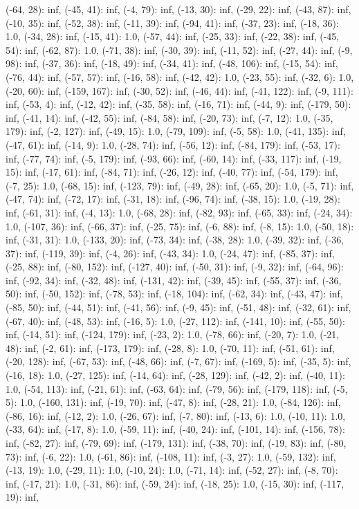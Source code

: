 \documentclass[parskip=half]{scrartcl}
\begin{document}
(-64, 28): inf, (-45, 41): inf, (-4, 79): inf, (-13, 30): inf, (-29, 22): inf, (-43, 87): inf, (-10, 35): inf, (-52, 38): inf, (-11, 39): inf, (-94, 41): inf, (-37, 23): inf, (-18, 36): 1.0, (-34, 28): inf, (-15, 41): 1.0, (-57, 44): inf, (-25, 33): inf, (-22, 38): inf, (-45, 54): inf, (-62, 87): 1.0, (-71, 38): inf, (-30, 39): inf, (-11, 52): inf, (-27, 44): inf, (-9, 98): inf, (-37, 36): inf, (-18, 49): inf, (-34, 41): inf, (-48, 106): inf, (-15, 54): inf, (-76, 44): inf, (-57, 57): inf, (-16, 58): inf, (-42, 42): 1.0, (-23, 55): inf, (-32, 6): 1.0, (-20, 60): inf, (-159, 167): inf, (-30, 52): inf, (-46, 44): inf, (-41, 122): inf, (-9, 111): inf, (-53, 4): inf, (-12, 42): inf, (-35, 58): inf, (-16, 71): inf, (-44, 9): inf, (-179, 50): inf, (-41, 14): inf, (-42, 55): inf, (-84, 58): inf, (-20, 73): inf, (-7, 12): 1.0, (-35, 179): inf, (-2, 127): inf, (-49, 15): 1.0, (-79, 109): inf, (-5, 58): 1.0, (-41, 135): inf, (-47, 61): inf, (-14, 9): 1.0, (-28, 74): inf, (-56, 12): inf, (-84, 179): inf, (-53, 17): inf, (-77, 74): inf, (-5, 179): inf, (-93, 66): inf, (-60, 14): inf, (-33, 117): inf, (-19, 15): inf, (-17, 61): inf, (-84, 71): inf, (-26, 12): inf, (-40, 77): inf, (-54, 179): inf, (-7, 25): 1.0, (-68, 15): inf, (-123, 79): inf, (-49, 28): inf, (-65, 20): 1.0, (-5, 71): inf, (-47, 74): inf, (-72, 17): inf, (-31, 18): inf, (-96, 74): inf, (-38, 15): 1.0, (-19, 28): inf, (-61, 31): inf, (-4, 13): 1.0, (-68, 28): inf, (-82, 93): inf, (-65, 33): inf, (-24, 34): 1.0, (-107, 36): inf, (-66, 37): inf, (-25, 75): inf, (-6, 88): inf, (-8, 15): 1.0, (-50, 18): inf, (-31, 31): 1.0, (-133, 20): inf, (-73, 34): inf, (-38, 28): 1.0, (-39, 32): inf, (-36, 37): inf, (-119, 39): inf, (-4, 26): inf, (-43, 34): 1.0, (-24, 47): inf, (-85, 37): inf, (-25, 88): inf, (-80, 152): inf, (-127, 40): inf, (-50, 31): inf, (-9, 32): inf, (-64, 96): inf, (-92, 34): inf, (-32, 48): inf, (-131, 42): inf, (-39, 45): inf, (-55, 37): inf, (-36, 50): inf, (-50, 152): inf, (-78, 53): inf, (-18, 104): inf, (-62, 34): inf, (-43, 47): inf, (-85, 50): inf, (-44, 51): inf, (-41, 56): inf, (-9, 45): inf, (-51, 48): inf, (-32, 61): inf, (-67, 40): inf, (-48, 53): inf, (-16, 5): 1.0, (-27, 112): inf, (-141, 10): inf, (-55, 50): inf, (-14, 51): inf, (-124, 179): inf, (-23, 2): 1.0, (-78, 66): inf, (-20, 7): 1.0, (-21, 48): inf, (-2, 61): inf, (-173, 179): inf, (-28, 8): 1.0, (-70, 11): inf, (-51, 61): inf, (-20, 128): inf, (-67, 53): inf, (-48, 66): inf, (-7, 67): inf, (-169, 5): inf, (-35, 5): inf, (-16, 18): 1.0, (-27, 125): inf, (-14, 64): inf, (-28, 129): inf, (-42, 2): inf, (-40, 11): 1.0, (-54, 113): inf, (-21, 61): inf, (-63, 64): inf, (-79, 56): inf, (-179, 118): inf, (-5, 5): 1.0, (-160, 131): inf, (-19, 70): inf, (-47, 8): inf, (-28, 21): 1.0, (-84, 126): inf, (-86, 16): inf, (-12, 2): 1.0, (-26, 67): inf, (-7, 80): inf, (-13, 6): 1.0, (-10, 11): 1.0, (-33, 64): inf, (-17, 8): 1.0, (-59, 11): inf, (-40, 24): inf, (-101, 14): inf, (-156, 78): inf, (-82, 27): inf, (-79, 69): inf, (-179, 131): inf, (-38, 70): inf, (-19, 83): inf, (-80, 73): inf, (-6, 22): 1.0, (-61, 86): inf, (-108, 11): inf, (-3, 27): 1.0, (-59, 132): inf, (-13, 19): 1.0, (-29, 11): 1.0, (-10, 24): 1.0, (-71, 14): inf, (-52, 27): inf, (-8, 70): inf, (-17, 21): 1.0, (-31, 86): inf, (-59, 24): inf, (-18, 25): 1.0, (-15, 30): inf, (-117, 19): inf, 
\end{document}
